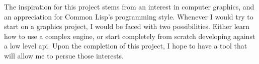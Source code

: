 
The inspiration for this project stems from an interest in computer graphics,
and an appreciation for Common Lisp's programming style.
Whenever I would try to start on a graphics project,
I would be faced with two possibilities.
Either learn how to use a complex engine,
or start completely from scratch developing against a low level \ac{api}.
Upon the completion of this project,
I hope to have a tool that will allow me to persue those interests.
